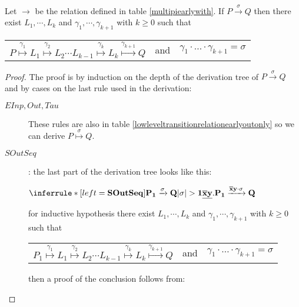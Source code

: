 \begin{proposition}\label{equivalencehightolow}
  Let $\rightarrow$ be the relation defined in table \ref{multipiearlywith}. If $P\xrightarrow{\sigma} Q$ then there exist $L_{1}, \cdots, L_{k}$ and $\gamma_{1}, \cdots, \gamma_{k+1}$ with $k\geq 0$ such that 
  \begin{center}
    \begin{tabular}{lll}
      $P \stackrel{\gamma_{1}}{\longmapsto} L_{1} \stackrel{\gamma_{2}}{\longmapsto} L_{2} \cdots L_{k-1} \stackrel{\gamma_{k}}{\longmapsto} L_{k} \stackrel{\gamma_{k+1}}{\longmapsto} Q$ 
    &
      and
    &
      $\gamma_{1} \cdot \ldots \cdot \gamma_{k+1} = \sigma$  
    \end{tabular}
  \end{center}
  \begin{proof}
    The proof is by induction on the depth of the derivation tree of $P\xrightarrow{\sigma} Q$ and by cases on the last rule used in the derivation:
    \begin{description}
      \item[$EInp, Out, Tau$]
      These rules are also in table \ref{lowleveltransitionrelationearlyoutonly} so we can derive $P \stackrel{\sigma}{\longmapsto}Q$.
      \item[$SOutSeq$]: 
	    the last part of the derivation tree looks like this:
	    \begin{center}
	      $\inferrule* [left=\bf{SOutSeq}]{
		  P_{1} \xrightarrow{\sigma} Q
		\\
		  |\sigma|>1
	      }{
		\underline{\overline{x}y}.P_{1} \xrightarrow{\overline{x}y \cdot \sigma} Q
	      }$	      
	    \end{center}
	    for inductive hypothesis there exist $L_{1}, \cdots, L_{k}$ and $\gamma_{1}, \cdots, \gamma_{k+1}$ with $k\geq 0$ such that 
	    \begin{center}
	      \begin{tabular}{lll}
		$P_{1} \stackrel{\gamma_{1}}{\longmapsto} L_{1} \stackrel{\gamma_{2}}{\longmapsto} L_{2} \cdots L_{k-1} \stackrel{\gamma_{k}}{\longmapsto} L_{k} \stackrel{\gamma_{k+1}}{\longmapsto} Q$ 
	      &
		and
	      &
		$\gamma_{1} \cdot \ldots \cdot \gamma_{k+1} =  \sigma$
	      \end{tabular}
	    \end{center}
	    then a proof of the conclusion follows from:
	    \begin{center}
\end{center}
\end{description}
\end{proof}
\end{proposition}
